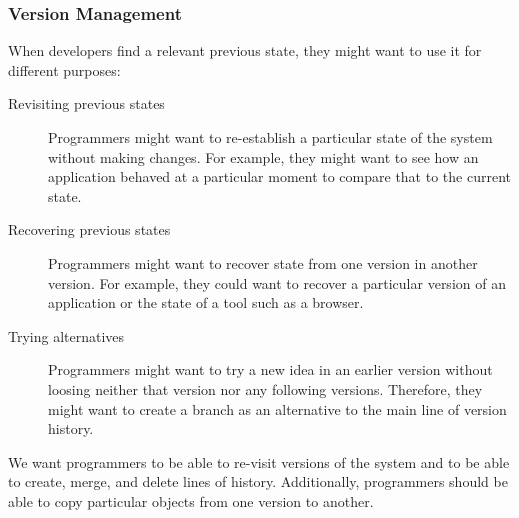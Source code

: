 \subsubsection{Version Management}

When developers find a relevant previous state, they might want to use it for different purposes:

\begin{description}
    \item[Revisiting previous states] Programmers might want to re-establish a particular state of the system without making changes. For example, they might want to see how an application behaved at a particular moment to compare that to the current state.
    \item[Recovering previous states] Programmers might want to recover state from one version in another version. For example, they could want to recover a particular version of an application or the state of a tool such as a browser. 
    \item[Trying alternatives] Programmers might want to try a new idea in an earlier version without loosing neither that version nor any following versions. Therefore, they might want to create a branch as an alternative to the main line of version history.
\end{description}

We want programmers to be able to re-visit versions of the system and to be able to create, merge, and delete lines of history.
Additionally, programmers should be able to copy particular objects from one version to another.
